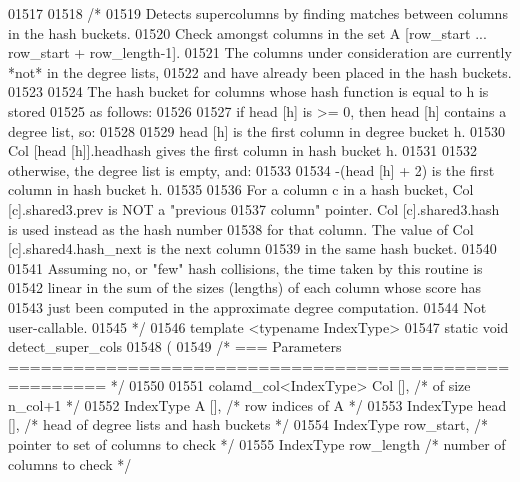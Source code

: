 \begin{DoxyCode}
{{{{{{{{{{{{{{{{{{{{{{{{{{{{01517 
01518 \textcolor{comment}{/*}
01519 \textcolor{comment}{  Detects supercolumns by finding matches between columns in the hash buckets.}
01520 \textcolor{comment}{  Check amongst columns in the set A [row\_start ... row\_start + row\_length-1].}
01521 \textcolor{comment}{  The columns under consideration are currently *not* in the degree lists,}
01522 \textcolor{comment}{  and have already been placed in the hash buckets.}
01523 \textcolor{comment}{}
01524 \textcolor{comment}{  The hash bucket for columns whose hash function is equal to h is stored}
01525 \textcolor{comment}{  as follows:}
01526 \textcolor{comment}{}
01527 \textcolor{comment}{  if head [h] is >= 0, then head [h] contains a degree list, so:}
01528 \textcolor{comment}{}
01529 \textcolor{comment}{  head [h] is the first column in degree bucket h.}
01530 \textcolor{comment}{  Col [head [h]].headhash gives the first column in hash bucket h.}
01531 \textcolor{comment}{}
01532 \textcolor{comment}{  otherwise, the degree list is empty, and:}
01533 \textcolor{comment}{}
01534 \textcolor{comment}{  -(head [h] + 2) is the first column in hash bucket h.}
01535 \textcolor{comment}{}
01536 \textcolor{comment}{  For a column c in a hash bucket, Col [c].shared3.prev is NOT a "previous}
01537 \textcolor{comment}{  column" pointer.  Col [c].shared3.hash is used instead as the hash number}
01538 \textcolor{comment}{  for that column.  The value of Col [c].shared4.hash\_next is the next column}
01539 \textcolor{comment}{  in the same hash bucket.}
01540 \textcolor{comment}{}
01541 \textcolor{comment}{  Assuming no, or "few" hash collisions, the time taken by this routine is}
01542 \textcolor{comment}{  linear in the sum of the sizes (lengths) of each column whose score has}
01543 \textcolor{comment}{  just been computed in the approximate degree computation.}
01544 \textcolor{comment}{  Not user-callable.}
01545 \textcolor{comment}{*/}
01546 \textcolor{keyword}{template} <\textcolor{keyword}{typename} IndexType>
01547 \textcolor{keyword}{static} \textcolor{keywordtype}{void} detect\_super\_cols
01548 (
01549   \textcolor{comment}{/* === Parameters ======================================================= */}
01550   
01551   colamd\_col<IndexType> Col [],    \textcolor{comment}{/* of size n\_col+1 */}
01552   IndexType A [],     \textcolor{comment}{/* row indices of A */}
01553   IndexType head [],    \textcolor{comment}{/* head of degree lists and hash buckets */}
01554   IndexType row\_start,    \textcolor{comment}{/* pointer to set of columns to check */}
01555   IndexType row\_length    \textcolor{comment}{/* number of columns to check */}
}}}}}}}}}}}}}}}}}}}}}}}}}}}}
\end{DoxyCode}
